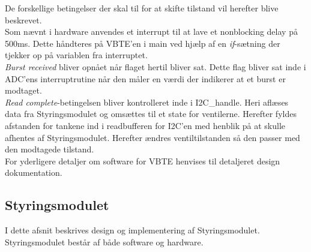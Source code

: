 De forskellige betingelser der skal til for at skifte tilstand vil herefter blive beskrevet. \\
Som nævnt i hardware anvendes et interrupt til at lave et nonblocking delay på 500ms. Dette håndteres på VBTE'en i main ved hjælp af en \textit{if}-sætning der tjekker op på variablen fra interruptet.\\
\textit{Burst received} bliver opnået når flaget hertil bliver sat. Dette flag bliver sat inde i ADC'ens interruptrutine når den måler en værdi der indikerer at et burst er modtaget.\\
\textit{Read complete}-betingelsen bliver kontrolleret inde i I2C\_handle. Heri aflæses data fra Styringsmodulet og omsættes til et state for ventilerne. Herefter fyldes afstanden for tankene ind i readbufferen for I2C'en med henblik på at skulle afhentes af Styringsmodulet. Herefter ændres ventiltilstanden så den passer med den modtagede tilstand.\\
For yderligere detaljer om software for VBTE henvises til detaljeret design dokumentation.
\subsection{Styringsmodulet}
I dette afsnit beskrives design og implementering af Styringsmodulet. Styringsmodulet består af både software og hardware.
